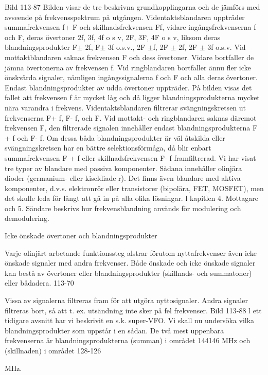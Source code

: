 \documentclass[a4paper,twoside,twocolumn,openright]{book}
\begin{document}
{{{{Bild 113-87
Bilden visar de tre beskrivna grundkopplingarna och de jämförs med avseende på frekvensspektrum på utgången.
Videntaktsblandaren uppträder summafrekvensen f+ F och skillnadsfrekvensen Ff, vidare ingångsfrekvenserna f och F, deras
övertoner 2f, 3f, 4f o s v, 2F, 3F, 4F o s v,
liksom deras blandningsprodukter F$\pm$ 2f, F$\pm$
3f o.s.v., 2F $\pm$f, 2F $\pm$ 2f, 2F $\pm$ 3f o.s.v.
Vid mottaktblandaren saknas frekvensen F och dess övertoner. Vidare bortfaller
de jämna övertonerna av frekvensen f.
Vid ringblandaren bortfaller ännu fler icke
önskvärda signaler, nämligen ingångssignalerna f och F och alla deras övertoner.
Endast blandningsprodukter av udda övertoner uppträder.
På bilden visas det fallet att frekvensen f
är mycket låg och då ligger blandningsprodukterna mycket nära varandra i frekvens.
Videntaktsblandaren filtrerar svängningskretsen ut frekvenserna F+ f, F- f, och F. Vid
mottakt- och ringblandaren saknas däremot
frekvensen F, den filtrerade signalen innehåller endast blandningsprodukterna F + f
och F- f. Om dessa båda blandningsprodukter är väl åtskilda eller svängningskretsen
har en bättre selektionsförmåga, då blir enbart summafrekvensen F + f eller skillnadsfrekvensen F- f framfiltrerad.
Vi har visat tre typer av blandare med
passiva komponenter. Sådana innehåller
olinjära dioder (germanium- eller kiseldiade r).
Det finns även blandare med aktiva komponenter, d.v.s. elektronrör eller transistorer
(bipolära, FET, MOSFET), men det skulle
leda för långt att gå in på alla olika lösningar.
l kapitlen 4. Mottagare och 5. Sändare beskrivs hur frekvensblandning används för
modulering och demodulering.

Icke önskade övertoner och blandningsprodukter

Varje olinjärt arbetande funktionssteg alstrar förutom nyttafrekvenser även icke önskade signaler med andra frekvenser. Både
önskade och icke önskade signaler kan bestå av övertoner eller blandningsprodukter
(skillnads- och summatoner) eller bådadera.
113-70

Vissa av signalerna filtreras fram för att
utgöra nyttosignaler. Andra signaler filtreras
bort, så att t. ex. utsändning inte sker på fel
frekvenser.
Bild 113-88
l ett tidigare avsnitt har vi beskrivit en s.k.
super-VFO. Vi skall nu undersöka vilka blandningsprodukter som uppstår i en sådan. De
två mest uppenbara frekvenserna är blandningsprodukterna (summan) i området 144146 MHz och (skillnaden) i området 128-126

MHz.

}}}}
\end{document}
